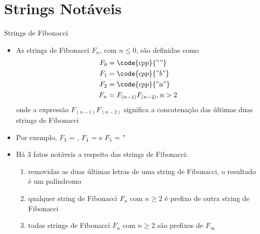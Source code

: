 \section{Strings Notáveis}

\begin{frame}[fragile]{Strings de Fibonacci}

    \begin{itemize}
        \item As strings de Fibonacci $F_n$, com $n \leq 0$, são definidas como
        \begin{align*}
            F_0 &= \code{cpp}{""} \\
            F_1 &= \code{cpp}{"b"} \\
            F_2 &=  \code{cpp}{"a"} \\
            F_n &= F_{(n-1)}F_{(n-2)}, n > 2
            \end{align*}
        onde a expressão $F_{(n-1)}F_{(n-2)}$ significa a concatenação das últimas duas strings de 
        Fibonacci
        \pause

        \item Por exemplo, $F_3$ = , $F_4$ =   e $F_5$ = "
        \pause

        \item Há 3 fatos notáveis a respeito das strings de Fibonacci:
        \pause
        \begin{enumerate}
            \item removidas as duas últimas letras de uma string de Fibonacci, o resultado é um 
                palíndromo
        \pause
            \item qualquer string de Fibonacci $F_n$ com $n\geq 2$ é prefixo de outra string de Fibonacci
        \pause
            \item todas strings de Fibonacci $F_n$ com $n\geq 2$ são prefixos de $F_\infty$
        \end{enumerate}

    \end{itemize}

\end{frame}

